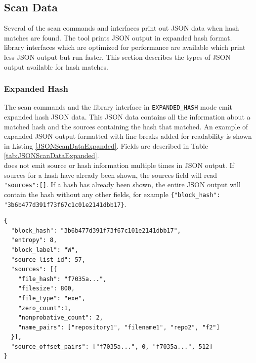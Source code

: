 \documentclass[11pt,fleqn]{article} %
\begin{document}
\subsection{Scan Data}
\label{ScanData}
Several of the \hdb scan commands and interfaces print out JSON data when hash matches are found. The \hdb tool prints JSON output in expanded hash format. \hdb library interfaces which are optimized for performance are available which print less JSON output but run faster. This section describes the types of JSON output available for hash matches.

\subsubsection{Expanded Hash}
The \hdb scan commands and the \hdb library interface in \verb+EXPANDED_HASH+ mode emit expanded hash JSON data. This JSON data contains all the information about a matched hash and the sources containing the hash that matched. An example of expanded JSON output formatted with line breaks added for readability is shown in Listing \ref{JSONScanDataExpanded}. Fields are described in Table \ref{tab:JSONScanDataExpanded}.\\

\hdb does not emit source or hash information multiple times in JSON output.  If sources for a hash have already been shown, the sources field will read \verb+"sources":[]+. If a hash has already been shown, the entire JSON output will contain the hash without any other fields, for example \verb+{"block_hash":+ \verb+"3b6b477d391f73f67c1c01e2141dbb17}+.\\

\lstset{style=customfile}
\begin{lstlisting}[float, caption={Example JSON block hash expanded data output from a scan match, with line breaks added for readability}, label=JSONScanDataExpanded]
{
  "block_hash": "3b6b477d391f73f67c101e2141dbb17",
  "entropy": 8,
  "block_label": "W",
  "source_list_id": 57,
  "sources": [{
    "file_hash": "f7035a...",
    "filesize": 800,
    "file_type": "exe",
    "zero_count":1,
    "nonprobative_count": 2,
    "name_pairs": ["repository1", "filename1", "repo2", "f2"]
  }],
  "source_offset_pairs": ["f7035a...", 0, "f7035a...", 512]
}
\end{lstlisting}
\end{document}
